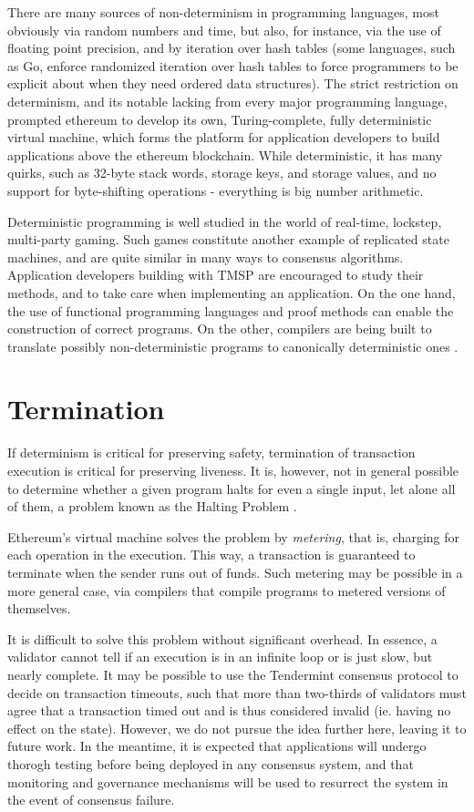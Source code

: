 There are many sources of non-determinism in programming languages, most obviously via random numbers and time,
but also, for instance, via the use of floating point precision, and by iteration over hash tables 
(some languages, such as Go, enforce randomized iteration over hash tables to force programmers to be explicit about when they need ordered data structures).
The strict restriction on determinism, and its notable lacking from every major programming language,
prompted ethereum to develop its own, Turing-complete, fully deterministic virtual machine,
which forms the platform for application developers to build applications above the ethereum blockchain.
While deterministic, it has many quirks, such as 32-byte stack words, storage keys, and storage values,
and no support for byte-shifting operations - everything is big number arithmetic.

Deterministic programming is well studied in the world of real-time, lockstep, multi-party gaming.
Such games constitute another example of replicated state machines, and are quite similar in many ways to consensus algorithms.
Application developers building with TMSP are encouraged to study their methods, and to take care when implementing an application.
On the one hand, the use of functional programming languages and proof methods can enable the construction of correct programs.
On the other, compilers are being built to translate possibly non-deterministic programs to canonically deterministic ones \cite{deterministicjs}.

\section{Termination}

If determinism is critical for preserving safety, termination of transaction execution is critical for preserving liveness.
It is, however, not in general possible to determine whether a given program halts for even a single input, let alone all of them,
a problem known as the Halting Problem \cite{halting, davis1958computability}.

Ethereum's virtual machine solves the problem by \emph{metering}, that is, charging for each operation in the execution.
This way, a transaction is guaranteed to terminate when the sender runs out of funds.
Such metering may be possible in a more general case, 
via compilers that compile programs to metered versions of themselves.

It is difficult to solve this problem without significant overhead.
In essence, a validator cannot tell if an execution is in an infinite loop or is just slow, but nearly complete.
It may be possible to use the Tendermint consensus protocol to decide on transaction timeouts, 
such that more than two-thirds of validators must agree that a transaction timed out and is thus considered invalid (ie. having no effect on the state).
However, we do not pursue the idea further here, leaving it to future work. 
In the meantime, it is expected that applications will undergo thorogh testing before being deployed in any consensus system,
and that monitoring and governance mechanisms will be used to resurrect the system in the event of consensus failure.

